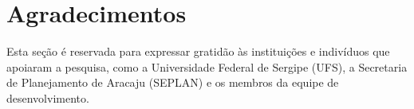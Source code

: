 \documentclass[12pt]{article}
\begin{document}
\section*{Agradecimentos} \label{sec:agradecimentos}

Esta seção é reservada para expressar gratidão às instituições e indivíduos que apoiaram a pesquisa, como a Universidade Federal de Sergipe (UFS), a Secretaria de Planejamento de Aracaju (SEPLAN) e os membros da equipe de desenvolvimento.








\end{document}
